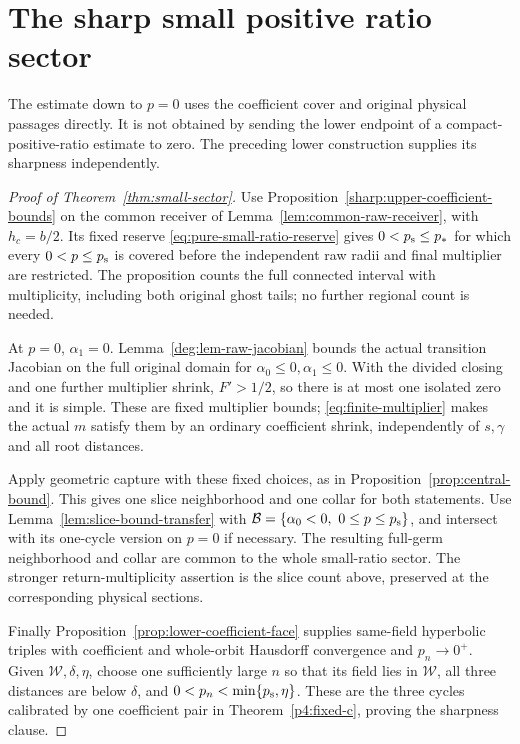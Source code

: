 \section{The sharp small positive ratio sector}
\label{sec:sharp-small-sector}

The estimate down to $p=0$ uses the coefficient cover and original
physical passages directly. It is not obtained by sending the lower
endpoint of a compact-positive-ratio estimate to zero. The preceding
lower construction supplies its sharpness independently.

\begin{proof}[Proof of Theorem~\ref{thm:small-sector}]
Use Proposition~\ref{sharp:upper-coefficient-bounds} on the common
receiver of Lemma~\ref{lem:common-raw-receiver}, with \(h_c=b/2\).
Its fixed reserve \eqref{eq:pure-small-ratio-reserve} gives
\(0<p_{\rm s}\le p_*\) for which every \(0<p\le p_{\rm s}\)
is covered before the independent raw radii and final multiplier are
restricted. The proposition counts the full connected interval with
multiplicity, including both original ghost tails; no further regional
count is needed.

At $p=0$, $\alpha_1=0$.
Lemma~\ref{deg:lem-raw-jacobian} bounds the actual transition
Jacobian on the full original domain for
$\alpha_0\le0,\alpha_1\le0$. With the divided closing and one
further multiplier shrink, $F'>1/2$, so there is at most one
isolated zero and it is simple. These are fixed multiplier bounds;
\eqref{eq:finite-multiplier} makes the actual $m$ satisfy them by
an ordinary coefficient shrink, independently of $s,\gamma$ and
all root distances.

Apply geometric capture with these fixed choices, as in
Proposition~\ref{prop:central-bound}. This gives one slice
neighborhood and one collar for both statements. Use
Lemma~\ref{lem:slice-bound-transfer} with
$\mathcal B=\{\alpha_0<0,\ 0\le p\le p_{\rm s}\}$, and
intersect with its one-cycle version on $p=0$ if necessary. The
resulting full-germ neighborhood and collar are common to the whole
small-ratio sector. The stronger return-multiplicity assertion is the
slice count above, preserved at the corresponding physical sections.

Finally Proposition~\ref{prop:lower-coefficient-face} supplies
same-field hyperbolic triples with coefficient and whole-orbit
Hausdorff convergence and $p_n\to0^+$. Given
$\mathcal W,\delta,\eta$, choose one sufficiently large $n$ so
that its field lies in $\mathcal W$, all three distances are below
$\delta$, and $0<p_n<\min\{p_{\rm s},\eta\}$.
These are the three cycles calibrated by one coefficient pair in
Theorem~\ref{p4:fixed-c}, proving the sharpness clause.
\end{proof}
